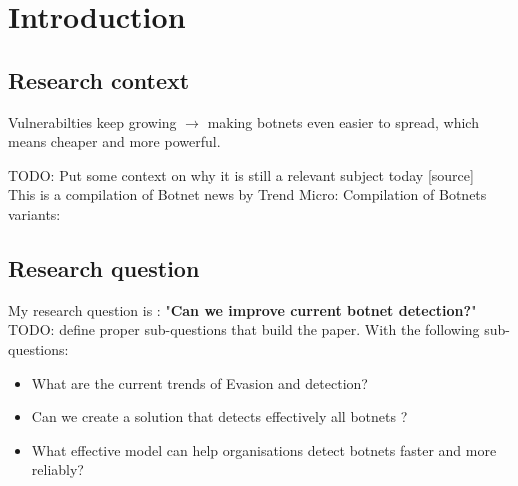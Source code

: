 
\chapter{Introduction} %

\label{Introduction} %


\newcommand{\keyword}[1]{\textbf{#1}}
\newcommand{\tabhead}[1]{\textbf{#1}}
\newcommand{\code}[1]{\texttt{#1}}
\newcommand{\file}[1]{\texttt{\bfseries#1}}
\newcommand{\option}[1]{\texttt{\itshape#1}}

\section{Research context}
Vulnerabilties keep growing $\rightarrow$ making botnets even easier to spread, which means cheaper and more powerful.

TODO: Put some context on why it is still a relevant subject today
[source]\\
This is a compilation of Botnet news by Trend Micro: %
Compilation of Botnets variants: %
\section{Research question}
My research question is : "\textbf{Can we improve current botnet detection?}"
TODO: define proper sub-questions that build the paper.
With the following sub-questions:
\begin{itemize}
\item What are the current trends of Evasion and detection?
\item Can we create a solution that detects effectively all botnets ?
\item What effective model can help organisations detect botnets faster and more reliably?
\end{itemize}
